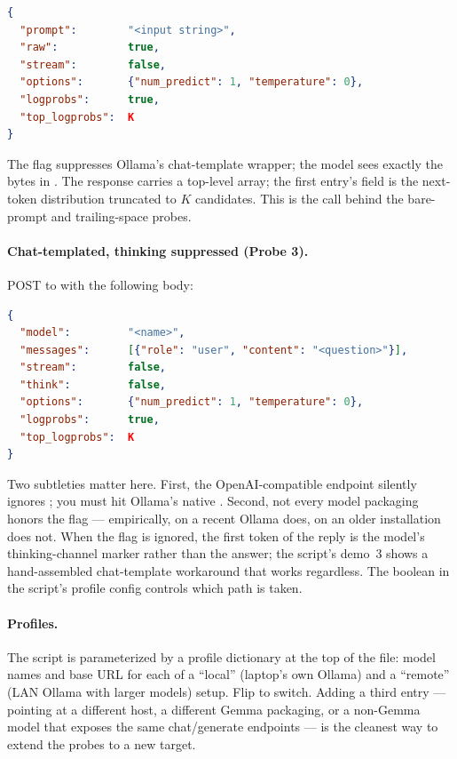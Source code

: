 \begin{lstlisting}[language=json,basicstyle=\ttfamily\footnotesize,numbers=none,frame=single,framerule=0.4pt,xleftmargin=1em,xrightmargin=1em]
{
  "prompt":        "<input string>",
  "raw":           true,
  "stream":        false,
  "options":       {"num_predict": 1, "temperature": 0},
  "logprobs":      true,
  "top_logprobs":  K
}
\end{lstlisting}

\noindent
The  flag suppresses Ollama's chat-template
wrapper; the model sees exactly the bytes in . The
response carries a top-level  array; the first
entry's  field is the next-token distribution
truncated to $K$ candidates. This is the call behind the
bare-prompt and trailing-space probes.

\paragraph{Chat-templated, thinking suppressed (Probe 3).}
POST to  with the following body:

\begin{lstlisting}[language=json,basicstyle=\ttfamily\footnotesize,numbers=none,frame=single,framerule=0.4pt,xleftmargin=1em,xrightmargin=1em]
{
  "model":         "<name>",
  "messages":      [{"role": "user", "content": "<question>"}],
  "stream":        false,
  "think":         false,
  "options":       {"num_predict": 1, "temperature": 0},
  "logprobs":      true,
  "top_logprobs":  K
}
\end{lstlisting}

\noindent
Two subtleties matter here. First, the OpenAI-compatible
 endpoint silently ignores
; you must hit Ollama's native .
Second, not every model packaging honors the flag ---
empirically,  on a recent Ollama does,
 on an older installation does not. When the
flag is ignored, the first token of the reply is the model's
thinking-channel marker rather than the answer; the script's
demo~3 shows a hand-assembled chat-template workaround that
works regardless. The boolean in the script's profile config
controls which path is taken.

\paragraph{Profiles.} The script is parameterized by a profile
dictionary at the top of the file: model names and base URL for
each of a ``local'' (laptop's own Ollama) and a ``remote'' (LAN
Ollama with larger models) setup. Flip  to
switch. Adding a third entry --- pointing at a different host, a
different Gemma packaging, or a non-Gemma model that exposes the
same chat/generate endpoints --- is the cleanest way to extend
the probes to a new target.
